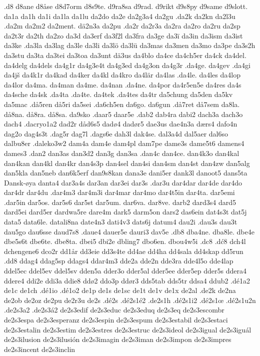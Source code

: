.d8
d8ane
d8åse
d8d7orm
d8s9te.
d9ra8sa
d9rad.
d9rikt
d9s8py
d9same
d9slott.
da1a
da1h
da1i
da1la
da1lu
da2do
da2e
da2g3a4
da2gu
.da2k
da2kn
da2l3u
.da2m
da2m2
da2ment.
dä2n3a
da2pu
.da2r
da2r3a
da2ra
da2ro
da2ru
da2sp
da2t3r
da2th
da2zo
da3d
da3erf
da3f2l
da3fra
da3ge
da3ï
da3in
da3ism
da3ist
da3ke
.da3la
da3lag
da3le
da3li
da3lö
da3lü
da3mas
da3men
da3mo
da3pe
da3s2h
da3stu
da3ta
da3tei
da3toa
da3unt
dä3us
da4blo
da4ce
da4ch5er
da4ck
da4del.
da4delg
da4dels
da4g1r
da4g3e4t
da4g3ed
da4g3on
da4g3r
.da4ge.
da4gev
.da4gi
da4jš
da4k1r
da4kad
da4ker
da4kl
da4kro
da4lär
da4las
.da4le.
da4les
da4lop
da4lor
da4ma.
da4man
da4me.
da4nan
.da4ne.
da4por
da4r5en5e
da4res
da4s
da4sche
da4sk
.da4ta
.da4te.
da4tek
.da4tes
da4tr
da5chung
da5den
da5kv
da5mac
.då5ren
då5ri
da5sei
.da6ch5en
da6go.
da6gun
.då7ret
då7sem
da8la.
då8na.
då8ra.
då8sa.
da9sko
.daar5
daar5e
.dab2
dab4ra
dabi2
dach3a
dach3o
dach4
.dacryo1a2
dad2r
dåd6s5
dadø4
dadør5
dae3us
dae4n3a
dærs4
dafo4n
dag2o
dag4s3t
.dag5r
dag7l
.dags6e
dah3l
dak4se.
dal3a4d
dal5aer
dal6so
dalbu8er
.daleko3w2
dam4a
dam4e
dam4pl
dam7pe
dame3s
dame5t6
damens4
dames3
.dan2
dan3as
dan3d2
dan3g
dan3sa
.dan4c
dan4ce.
dan4k3o
dan4kal
dan4kan
dan4kl
dan4kr
dan4s3p
dan4sel
dan4si
dan4sm
dan4st
dan4zw
dan5alg
dan5kla
dan5neb
dan6k5erf
dan9s8kan
dana3e
dani5er
dank3l
danoot5
dans5ta
Dansk-øya
danta4
dar3a4s
dar3an
dar3ei
dar3s
.dar3u
dar4dar
dar4de
dar4do
dar4dr
dar4du
.dar4m3
dar4m3i
dar4mar
dar4mo
dar4t5in
dar4ta.
dar5emi
.dar5in
dar5os.
dar5s6
dar5st
dar5um.
dar6va.
dar8ve.
darb2
dard3s4
dard5
dard5ei
dard5er
dardwa5re
dare4m
dark5
darm5on
dars2
das6ein
dat4s3t
dat5j
data5
data6le.
datali8na
date4n3
dati4v3
dats6j
datum4
dau2i
.dau3s
dau3t
dau5go
dau6sse
daud7s8
.daue4
dauer5e
dauri3
dav5e
.db8
dba4ne.
dba8le.
dbe4e
dbe5s6t
dbe6te.
dbe8ta.
dbei5
dbi2e
dbling7
dbo6en.
dbou4w5i
.dc8
.dć8
dch4l
dchengene6
dco2r
dd1år
dd3eie
dd3s4te
dd4ae
dd4ha
dd4sala
dd4skap
dd5run
.dd8
ddag4
ddag5sp
ddags4
ddar4m3
dde2a
dde2n
dde3ra
dde4l5o
dde4lap
ddel5ec
ddel5ev
ddel5sv
dden5a
dder3o
dder5al
dder5ee
dder5ep
dder5s
ddera4
ddere4
ddi2e
ddi3a
ddie8
ddø2
ddo3p
ddør3
dds5tab
dds5tr
ddsa4
ddub2
.dé1a2
de1c
de1ch
.dé1io
.dé1o2
de1p
de1s
de1sc
de1t
de1v
de1x
de2al
.de2k
de2na
de2ob
de2oz
de2pu
de2r3u
de2s
.dé2s
.dé2s1é2
.de2s1h
.dé2s1i2
.dé2s1œ
.dé2s1u2n
.de2s3a2
.de2s3á2
de2s3edif
de2s3educ
de2s3eduq
de2s3eq
de2s3escombr
de2s3espa
de2s3esperanz
de2s3espin
de2s3espum
de2s3estabil
de2s3estaci
de2s3estalin
de2s3estim
de2s3estres
de2s3estruc
de2s3ideol
de2s3igual
de2s3iguál
de2s3ilusion
de2s3ilusión
de2s3imagin
de2s3iman
de2s3impon
de2s3impres
de2s3incent
de2s3inclin
